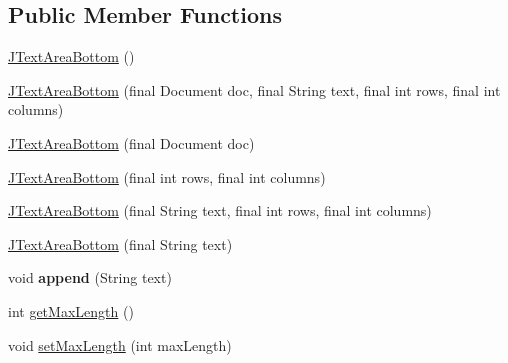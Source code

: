 \subsection*{Public Member Functions}
\begin{DoxyCompactItemize}
\item 
\hyperlink{classgov_1_1fnal_1_1ppd_1_1dd_1_1util_1_1guiUtils_1_1JTextAreaBottom_a0dfcd08ba2af7a269c879f24c63d36da}{J\-Text\-Area\-Bottom} ()
\item 
\hyperlink{classgov_1_1fnal_1_1ppd_1_1dd_1_1util_1_1guiUtils_1_1JTextAreaBottom_a52062eb76a11640a08aadd36d438cbf7}{J\-Text\-Area\-Bottom} (final Document doc, final String text, final int rows, final int columns)
\item 
\hyperlink{classgov_1_1fnal_1_1ppd_1_1dd_1_1util_1_1guiUtils_1_1JTextAreaBottom_ad8f8766ae75159111d67ae15a94ee9e5}{J\-Text\-Area\-Bottom} (final Document doc)
\item 
\hyperlink{classgov_1_1fnal_1_1ppd_1_1dd_1_1util_1_1guiUtils_1_1JTextAreaBottom_a049b9c3afc393eeb0425d9479081f3a4}{J\-Text\-Area\-Bottom} (final int rows, final int columns)
\item 
\hyperlink{classgov_1_1fnal_1_1ppd_1_1dd_1_1util_1_1guiUtils_1_1JTextAreaBottom_a060b28650ba322c50250ccd3abdf21fd}{J\-Text\-Area\-Bottom} (final String text, final int rows, final int columns)
\item 
\hyperlink{classgov_1_1fnal_1_1ppd_1_1dd_1_1util_1_1guiUtils_1_1JTextAreaBottom_af08d68ec3ff4ee1b7f7ac9e3d9e3369b}{J\-Text\-Area\-Bottom} (final String text)
\item 
\hypertarget{classgov_1_1fnal_1_1ppd_1_1dd_1_1util_1_1guiUtils_1_1JTextAreaBottom_a1e24da590e9d144aeaf2b038567fbc9d}{void {\bfseries append} (String text)}\label{classgov_1_1fnal_1_1ppd_1_1dd_1_1util_1_1guiUtils_1_1JTextAreaBottom_a1e24da590e9d144aeaf2b038567fbc9d}

\item 
int \hyperlink{classgov_1_1fnal_1_1ppd_1_1dd_1_1util_1_1guiUtils_1_1JTextAreaBottom_a5026b4735f7977c04fc067c14e1d823e}{get\-Max\-Length} ()
\item 
void \hyperlink{classgov_1_1fnal_1_1ppd_1_1dd_1_1util_1_1guiUtils_1_1JTextAreaBottom_aef8184ebb1016ea7a0a02bff3f73b4cd}{set\-Max\-Length} (int max\-Length)
\end{DoxyCompactItemize}


